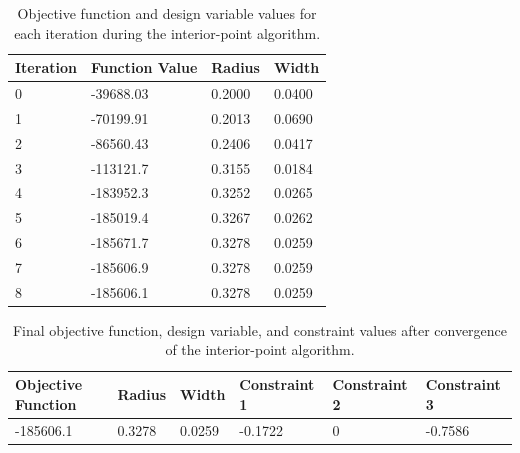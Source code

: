 \documentclass[11pt]{article}
\begin{document}
\begin{solution}
\begin{table}[htbp]
	\centering
    \begin{tabular}{|l|l|l|l|}
        \hline
       Iteration & Function Value & Radius & Width\\ \hline
0 & -39688.03	  & 0.2000   & 0.0400\\ 
1 &-70199.91	& 0.2013    & 0.0690 \\ 
2 & -86560.43	& 0.2406 &   0.0417\\ 
3 & -113121.7 & 	0.3155   & 0.0184\\ 
4 & -183952.3	& 0.3252  &  0.0265\\ 
5 & -185019.4	 & 0.3267  &  0.0262\\ 
6 & -185671.7	& 0.3278  &  0.0259\\ 
7 & -185606.9	& 0.3278   & 0.0259\\ 
8 & -185606.1	& 0.3278   & 0.0259\\ 
        \hline
    \end{tabular}
	\caption{Objective function and design variable values for each iteration during the interior-point algorithm.}
	\label{Table3}
\end{table}

\begin{table}[htbp]
	\centering
    \begin{tabular}{|l|l|l|l|l|l|}
        \hline
	Objective Function & Radius & Width & Constraint 1 & Constraint 2 & Constraint 3 \\ \hline
	-185606.1 & 0.3278 & 0.0259 & -0.1722 & 0 & -0.7586 \\ 
	\hline
    \end{tabular}
	\caption{Final objective function, design variable, and constraint values after convergence of the interior-point algorithm.}
	\label{Table4}
\end{table}

\end{solution}
\end{document}
